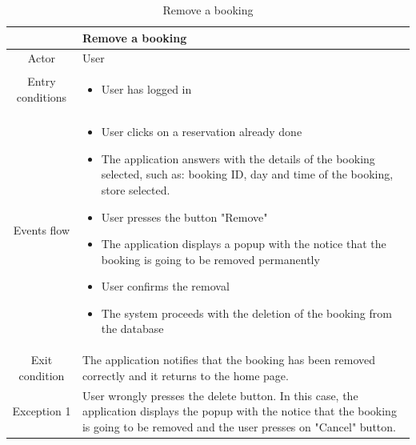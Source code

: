 \documentclass[table, 12pt]{article}
\begin{document}
\begin{longtable}{|c| p{10cm}|}
    \caption{Remove a booking}                                                                                                                                                                                   \\
    \hline
                     & Remove a booking                                                                                                                                                                          \\
    \hline
    Actor            & User                                                                                                                                                                                      \\
    \hline
    Entry conditions & \begin{itemize}
        \item User has logged in
    \end{itemize}                                                                                                                                                                \\
    \hline
    Events flow      & \begin{itemize}[nosep,after=\strut]
        \item User clicks on a reservation already done
        \item The application answers with the details of the booking selected, such as: booking ID, day and time of the booking, store selected.
        \item User presses the button "Remove"
        \item The application displays a popup with the notice that the booking is going to be removed permanently
        \item User confirms the removal
        \item The system proceeds with the deletion of the booking from the database
    \end{itemize}                                                                                                                                                                \\
    \hline
    Exit condition   & The application notifies that the booking has been removed correctly and it returns to the home page.
    \\
    \hline
    \hline
    Exception 1      & User wrongly presses the delete button. In this case, the application displays the popup with the notice that the booking is going to be removed and the user presses on "Cancel" button. \\
    \hline
\end{longtable}
\end{document}
